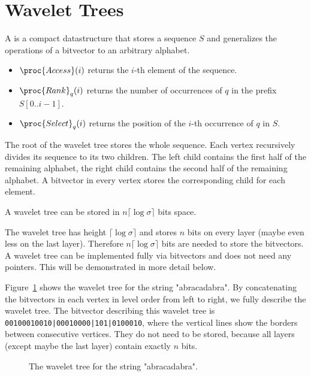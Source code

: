 \section{Wavelet Trees}

\begin{Definition}
  A  is a compact datastructure that stores a sequence $S$ and generalizes the operations of a bitvector to an arbitrary alphabet.
  \begin{itemize}
    \item $\proc{Access}(i)$ returns the $i$-th element of the sequence.
    \item $\proc{Rank}_q(i)$ returns the number of occurrences of $q$ in the prefix $S[0..i-1]$.
    \item $\proc{Select}_q(i)$ returns the position of the $i$-th occurrence of $q$ in $S$.
  \end{itemize}

  The root of the wavelet tree stores the whole sequence. Each vertex recursively divides its sequence to its two children. The left child contains the first half of the remaining alphabet, the right child contains the second half of the remaining alphabet. A bitvector in every vertex stores the corresponding child for each element.
\end{Definition}

\begin{Lemma}
  A wavelet tree can be stored in $n\lceil\log\sigma\rceil$ bits space.
\end{Lemma}

\begin{Proof}
  The wavelet tree has height $\lceil\log\sigma\rceil$ and stores $n$ bits on every layer (maybe even less on the last layer). Therefore $n\lceil\log\sigma\rceil$ bits are needed to store the bitvectors. A wavelet tree can be implemented fully via bitvectors and does not need any pointers. This will be demonstrated in more detail below.
\end{Proof}

\begin{Example}
  \label{exp:waveletTree}
  Figure~\ref{fig:waveletTreeExample} shows the wavelet tree for the string "abracadabra". By concatenating the bitvectors in each vertex in level order from left to right, we fully describe the wavelet tree. The bitvector describing this wavelet tree is \texttt{00100010010|00010000|101|0100010}, where the vertical lines show the borders between consecutive vertices. They do not need to be stored, because all layers (except maybe the last layer) contain exactly $n$ bits.
  \begin{figure}[htb]
    \centering
    
    \caption{The wavelet tree for the string "abracadabra".}
    \label{fig:waveletTreeExample}
  \end{figure}
\end{Example}

